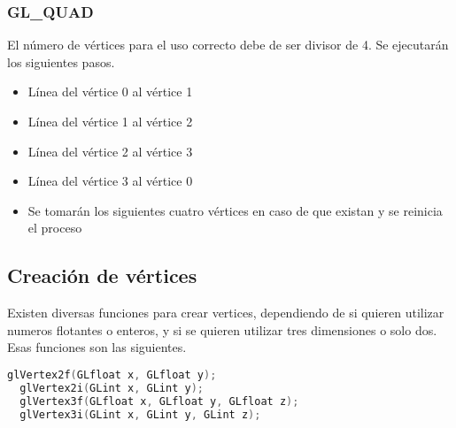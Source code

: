 \documentclass{report}
\begin{document}
\subsubsection{GL\_QUAD}
El número de vértices para el uso correcto debe de ser divisor de 4. Se ejecutarán los siguientes pasos.
\begin{itemize}
  \item{Línea del vértice 0 al vértice 1}
  \item{Línea del vértice 1 al vértice 2}
  \item{Línea del vértice 2 al vértice 3}
  \item{Línea del vértice 3 al vértice 0}
    \item{Se tomarán los siguientes cuatro vértices en caso de que existan y se reinicia el proceso}
\end{itemize}
\subsection{Creación de vértices}
Existen diversas funciones para crear vertices, dependiendo de si quieren utilizar numeros flotantes o enteros, y si se quieren utilizar tres dimensiones o solo dos. Esas funciones son las siguientes.
\begin{lstlisting}[language=C]
  glVertex2f(GLfloat x, GLfloat y);
  glVertex2i(GLint x, GLint y);
  glVertex3f(GLfloat x, GLfloat y, GLfloat z);
  glVertex3i(GLint x, GLint y, GLint z);
\end{lstlisting}
\end{document}
